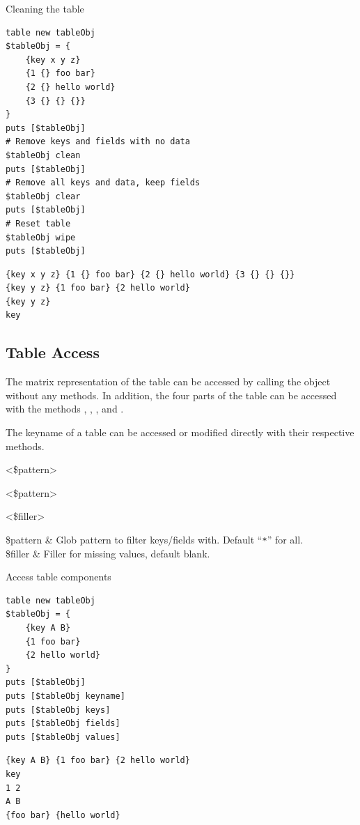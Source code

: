 \begin{example}{Cleaning the table}
\begin{lstlisting}
table new tableObj
$tableObj = {
    {key x y z}
    {1 {} foo bar}
    {2 {} hello world}
    {3 {} {} {}}
}
puts [$tableObj]
# Remove keys and fields with no data
$tableObj clean
puts [$tableObj]
# Remove all keys and data, keep fields
$tableObj clear
puts [$tableObj]
# Reset table 
$tableObj wipe
puts [$tableObj]
\end{lstlisting}
\tcblower
\begin{lstlisting}
{key x y z} {1 {} foo bar} {2 {} hello world} {3 {} {} {}}
{key y z} {1 foo bar} {2 hello world}
{key y z}
key
\end{lstlisting}
\end{example}
\clearpage

\subsection{Table Access}
The matrix representation of the table can be accessed by calling the object without any methods. 
In addition, the four parts of the table can be accessed with the methods , , , and .

The keyname of a table can be accessed or modified directly with their respective methods. 
\begin{syntax}
\end{syntax}
\begin{syntax}
 <\$pattern>
\end{syntax}
\begin{syntax}
 <\$pattern>
\end{syntax}
\begin{syntax}
 <\$filler>
\end{syntax}
\begin{args}
\$pattern & Glob pattern to filter keys/fields with. Default ``\texttt{*}'' for all. \\
\$filler & Filler for missing values, default blank.
\end{args}

\begin{example}{Access table components}
\begin{lstlisting}
table new tableObj
$tableObj = {
    {key A B}
    {1 foo bar}
    {2 hello world}
}
puts [$tableObj]
puts [$tableObj keyname]
puts [$tableObj keys]
puts [$tableObj fields]
puts [$tableObj values]
\end{lstlisting}
\tcblower
\begin{lstlisting}
{key A B} {1 foo bar} {2 hello world}
key
1 2
A B
{foo bar} {hello world}
\end{lstlisting}
\end{example}

